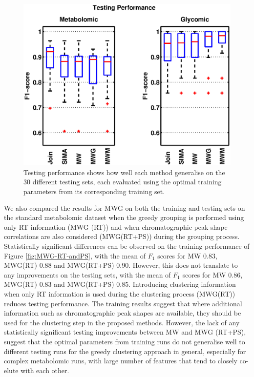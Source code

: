 \begin{figure}[!htbp]
\centering\includegraphics[width=0.65\columnwidth]{04-matching/figures/figure_4.eps}
\centering\caption{\label{fig:glyco-datasets-alignment-test}Testing performance shows how well each method generalise on the 30 different testing sets, each evaluated using the optimal training parameters from its corresponding training set.}
\end{figure}

We also compared the results for MWG on both the training and testing sets on the standard metabolomic dataset when the greedy grouping is performed using only RT information (MWG (RT)) and when chromatographic peak shape correlations are also considered (MWG(RT+PS)) during the grouping process. Statistically significant differences can be observed on the training performance of Figure \ref{fig:MWG-RT-andPS}, with the mean of $F\ensuremath{_{1}}$ scores for MW 0.83, MWG(RT) 0.88 and MWG(RT+PS) 0.90. However, this does not translate to any improvements on the testing sets, with the mean of $F\ensuremath{_{1}}$ scores for MW 0.86, MWG(RT) 0.83 and MWG(RT+PS) 0.85. Introducing clustering information when only RT information is used during the clustering process (MWG(RT)) reduces testing performance. The training results suggest that where additional information such as chromatographic peak shapes are available, they should be used for the clustering step in the proposed methods. However, the lack of any statistically significant testing improvements between MW and MWG (RT+PS), suggest that the optimal parameters from training runs do not generalise well to different testing runs for the greedy clustering approach in general, especially for complex metabolomic runs, with large number of features that tend to closely co-elute with each other.


